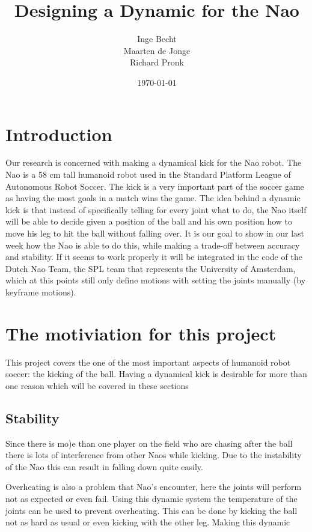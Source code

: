 \documentclass[a4paper]{article}
\begin{document}
\title{Designing a Dynamic for the Nao}
\author{Inge Becht \\ Maarten de Jonge \\ Richard Pronk}
\date{\today}
\maketitle

\section{Introduction}
Our research is concerned with making a dynamical kick for the Nao robot. The
Nao is a 58 cm tall humanoid robot used in the Standard Platform League of
Autonomous Robot Soccer. The kick is a very important part of the soccer game as
having the most goals in a match wins the game. The idea behind a dynamic kick
is that instead of specifically telling for every joint what to do, the Nao
itself will be able to decide given a position of the ball and his own position
how to move his leg to hit the ball without falling over. It is our goal to show
in our last week how the Nao is able to do this, while making a trade-off
between accuracy and stability. If it seems to work properly it will be
integrated in the code of the Dutch Nao Team, the SPL team that represents the
University of Amsterdam, which at this points still only 
define motions with setting the 
joints manually (by keyframe motions).

\section{The motiviation for this project} 
This project covers the one of the most important aspects of humanoid
robot soccer: the kicking of the ball.
Having a dynamical kick is desirable for more than one reason which will be
covered in these sections

\subsection{Stability}
Since there is mo)e than one player on
the field who are chasing after the ball
there is lots of interference from other Naos while kicking. Due to the
instability of the Nao this can result in falling down quite easily. 

Overheating is also a problem that Nao’s encounter, here the joints will perform
not as expected or even fail. Using this dynamic system the temperature of the
joints can be used to prevent overheating. This can be done by kicking the ball
not as hard as usual or even kicking with the other leg. Making this dynamic
\end{document}
